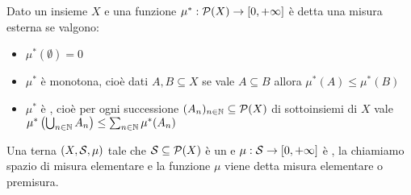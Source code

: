 \begin{definition}
	Dato un insieme $X$ e una funzione $\mu^*:\mathcal P(X)\to \Rpiu$ è detta una misura esterna se valgono:
	\begin{itemize}
		\item $\mu^*(\emptyset)=0$
		\item $\mu^*$ è monotona, cioè dati $A,B\subseteq X$ se vale $A\subseteq B$ allora $\mu^*(A)\le \mu^*(B)$
		\item $\mu^*$ è \sigsubadd{}, cioè  per ogni successione $(A_n)_{n\in\N}\subseteq \mathcal P(X)$ di sottoinsiemi di $X$ vale $\mu^*\left(\bigcup_{n\in\mathbb{N}}A_n\right)\le \sum_{n\in\N} \mu^*(A_n)$
	\end{itemize}
\end{definition}

\begin{definition}
	Una terna $(X,\S,\mu)$ tale che $\S\subseteq\mathcal P(X)$ è un \semiring{} e $\mu:\S\to \Rpiu$ è \sigadd{}, la chiamiamo spazio di misura elementare e la funzione $\mu$ viene detta misura elementare o premisura.
\end{definition}

